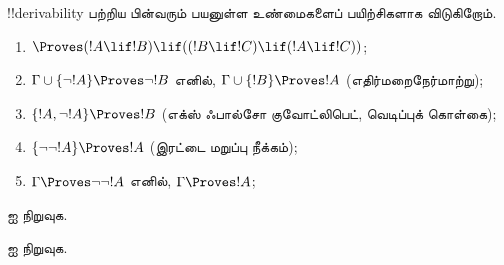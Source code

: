 \documentclass[../../../include/open-logic-section]{subfiles}
\begin{document}
!!{derivability} பற்றிய பின்வரும் பயனுள்ள உண்மைகளைப் பயிற்சிகளாக விடுகிறோம்.

\begin{prop}
\begin{enumerate}
\item $\Proves (!A \lif !B) \lif ((!B \lif !C)
  \lif (!A \lif !C))$; 
\item $\Gamma \cup \{ \lnot !A\}
  \Proves \lnot !B$ எனில், $\Gamma \cup \{ !B\} \Proves
  !A$ (எதிர்மறைநேர்மாற்று); 
\item  $\{ !A, \lnot!A\} \Proves
    !B$ (எக்ஸ் ஃபால்சோ குவோட்லிபெட், வெடிப்புக் கொள்கை); 
\item  $\{ \lnot\lnot!A\} \Proves
  !A$ (இரட்டை மறுப்பு நீக்கம்);
\item $\Gamma \Proves \lnot\lnot!A$ எனில், $\Gamma \Proves
  !A$;
\end{enumerate}
\end{prop}

\begin{prob}
   ஐ நிறுவுக.
\end{prob}
\tagendprob

\begin{prob}
   ஐ நிறுவுக.
\end{prob}
\tagendprob
\end{document}
